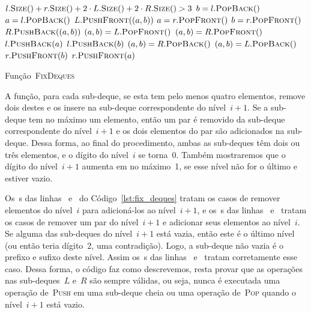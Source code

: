 \documentclass[main.tex]{subfiles}
\begin{document}
\begin{algorithm}
\begin{algorithmic}[1]

\Require $l.\Call{Size}{\null} + r.\Call{Size}{\null} + 2\cdot L.\Call{Size}{\null} + 2\cdot R.\Call{Size}{\null} > 3$
     \label{line:fd:if5}
        \State $b = {l}.\Call{PopBack}{\null}$
        \State $a = {l}.\Call{PopBack}{\null}$
        \State ${L}.\Call{PushFront}{(a, b)}$
    \EndIf
     \label{line:fd:if6}
        \State $a = {r}.\Call{PopFront}{\null}$
        \State $b = {r}.\Call{PopFront}{\null}$
        \State ${R}.\Call{PushBack}{(a, b)}$
    \EndIf
     \label{line:fd:if3}
         \label{line:fd:if1}
            \State $(a, b) = {L}.\Call{PopFront}{\null}$
        \Else
            \State $(a, b) = {R}.\Call{PopFront}{\null}$
        \EndIf
        \State ${l}.\Call{PushBack}{a}$
        \State ${l}.\Call{PushBack}{b}$
    \EndIf
     \label{line:fd:if4}
         \label{line:fd:if2}
            \State $(a, b) = {R}.\Call{PopBack}{\null}$
        \Else
            \State $(a, b) = {L}.\Call{PopBack}{\null}$
        \EndIf
        \State ${r}.\Call{PushFront}{b}$
        \State ${r}.\Call{PushFront}{a}$
    \EndIf
\EndFunction

\end{algorithmic}
\caption{Função~\textsc{FixDeques}} \label{lst:fix_deques}
\end{algorithm}

A função, para cada sub-deque, se esta tem pelo menos quatro elementos, remove dois destes e os insere na sub-deque correspondente do nível~$i+1$. Se a sub-deque tem no máximo um elemento, então um par é removido da sub-deque correspondente do nível~$i+1$ e os dois elementos do par são adicionados na sub-deque. Dessa forma, ao final do procedimento, ambas as sub-deques têm dois ou três elementos, e o dígito do nível~$i$ se torna~0. Também mostraremos que o dígito do nível~$i+1$ aumenta em no máximo~1, se esse nível não for o último e estiver vazio.

Os~s das linhas~ e~ do Código~\ref{lst:fix_deques} tratam os casos de remover elementos do nível~$i$ para adicioná-los ao nível~${i+1}$, e os~s das linhas~ e~ tratam os casos de remover um par do nível~$i+1$ e adicionar seus elementos ao nível~$i$. Se alguma das sub-deques do nível~$i+1$ está vazia, então este é o último nível (ou então teria dígito~2, uma contradição). Logo, a sub-deque não vazia é o prefixo e sufixo deste nível. Assim os~s das linhas~ e~ tratam corretamente esse caso. Dessa forma, o código faz como descrevemos, resta provar que as operações nas sub-deques~$L$ e~$R$ são sempre válidas, ou seja, nunca é executada uma operação de~\textsc{Push} em uma sub-deque cheia ou uma operação de~\textsc{Pop} quando o nível~$i+1$ está vazio.
\end{document}
